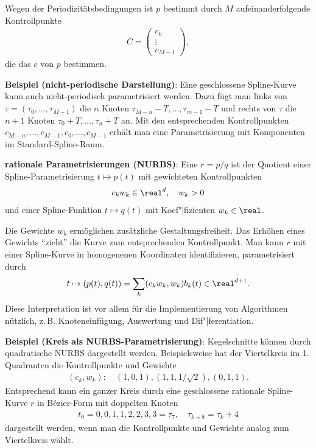 Wegen der Periodizitätsbedingungen ist $p$ bestimmt durch $M$ aufeinanderfolgende Kontrollpunkte
\begin{align*}
    C = \begin{pmatrix}c_0\\\vdots\\c_{M-1}\end{pmatrix},
\end{align*}
die das  $c$ von $p$ bestimmen.

\linie

\textbf{Beispiel (nicht-periodische Darstellung)}:
Eine geschlossene Spline-Kurve kann auch nicht-periodisch parametrisiert werden.
Dazu fügt man links von $\tau = (\tau_0, \dotsc, \tau_{M-1})$ die $n$ Knoten
$\tau_{M-n} - T, \dotsc, \tau_{m-1} - T$ und rechts von $\tau$ die $n + 1$ Knoten
$\tau_0 + T, \dotsc, \tau_n + T$ an.
Mit den entsprechenden Kontrollpunkten $c_{M-n}, \dotsc, c_{M-1}, c_0, \dotsc, c_{M-1}$
erhält man eine Parametrisierung mit Komponenten im Standard-Spline-Raum.

\linie
\pagebreak

\textbf{rationale Parametrisierungen (NURBS)}:
Eine  $r = p/q$ ist der
Quotient einer Spline-Parametrisierung $t \mapsto p(t)$ mit gewichteten Kontrollpunkten
\begin{align*}
    c_k w_k \in \real^d,\quad w_k > 0
\end{align*}
und einer Spline-Funktion $t \mapsto q(t)$ mit Koef"|fizienten $w_k \in \real$.

Die Gewichte $w_k$ ermöglichen zusätzliche Gestaltungsfreiheit.
Das Erhöhen eines Gewichts "`zieht"' die Kurve zum entsprechenden Kontrollpunkt.
Man kann $r$ mit einer Spline-Kurve in homogenenen Koordinaten identifizieren,
parametrisiert durch
\begin{align*}
    t \mapsto (p(t), q(t)) = \sum_k (c_k w_k, w_k) b_k(t) \in \real^{d+1}.
\end{align*}
Diese Interpretation ist vor allem für die Implementierung von Algorithmen nützlich,
z.\,B. Knoteneinfügung, Auswertung und Dif"|ferentiation.

\linie

\textbf{Beispiel (Kreis als NURBS-Parametrisierung)}:
Kegelschnitte können durch quadratische NURBS dargestellt werden.
Beispielsweise hat der Viertelkreis im 1. Quadranten die Kontrollpunkte und Gewichte
\begin{align*}
    (c_k, w_k)\colon\quad
    (1, 0, 1), (1, 1, 1/\sqrt{2}), (0, 1, 1).
\end{align*}
Entsprechend kann ein ganzer Kreis durch eine geschlossene rationale Spline-Kurve $r$ in
Bézier-Form mit doppelten Knoten
\begin{align*}
    t_0 = 0, 0, 1, 1, 2, 2, 3, 3 = \tau_7,\quad
    \tau_{k+8} = \tau_k + 4
\end{align*}
dargestellt werden, wenn man die Kontrollpunkte und Gewichte analog zum Viertelkreis wählt.

